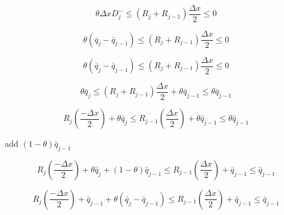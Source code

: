 \documentclass[10pt]{article}
\begin{document}
\[ \theta \Delta x D^-_{j} \le \left(R_j + R_{j-1}\right) \dfrac{\Delta x}{2}  \le 0 \]

\[ \theta \left(\bar{q}_{j} - \bar{q}_{j-1}\right) \le \left(R_j + R_{j-1}\right) \dfrac{\Delta x}{2}  \le 0 \]

\[ \theta \left(\bar{q}_{j} - \bar{q}_{j-1}\right) \le \left(R_j + R_{j-1}\right) \dfrac{\Delta x}{2}  \le 0 \]

\[ \theta\bar{q}_{j}  \le \left(R_j + R_{j-1}\right) \dfrac{\Delta x}{2} + \theta\bar{q}_{j-1}  \le \theta \bar{q}_{j-1} \]

\[  R_j \left( \dfrac{-\Delta x}{2}\right)  + \theta\bar{q}_{j}  \le R_{j-1} \left(\dfrac{\Delta x}{2}\right) + \theta\bar{q}_{j-1}  \le \theta\bar{q}_{j-1} \]

add $\left(1 - \theta\right)\bar{q}_{j-1}$

\[  R_j \left( \dfrac{-\Delta x}{2}\right)  + \theta\bar{q}_{j} + \left(1 - \theta\right)\bar{q}_{j-1}  \le R_{j-1} \left(\dfrac{\Delta x}{2}\right) + \bar{q}_{j-1}  \le \bar{q}_{j-1} \]

\[  R_j \left( \dfrac{-\Delta x}{2}\right)  + \bar{q}_{j-1}  + \theta\left(\bar{q}_{j} - \bar{q}_{j-1} \right) \le R_{j-1} \left(\dfrac{\Delta x}{2}\right) + \bar{q}_{j-1}  \le \bar{q}_{j-1} \]
 
\end{document}
